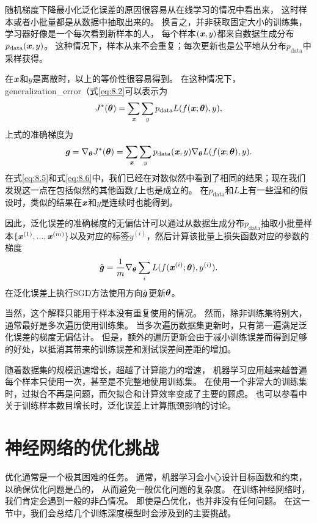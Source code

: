 随机梯度下降最小化泛化误差的原因很容易从在线学习的情况中看出来，
这时样本或者小批量都是从数据中抽取出来的。
换言之，并非获取固定大小的训练集，学习器好像是一个每次看到新样本的人，
每个样本$(\boldsymbol{\mathit{x}},y)$都来自数据生成分布$p_{\text{data}}(\boldsymbol{\mathit{x}},y)$。
这种情况下，样本从来不会重复；每次更新也是公平地从分布$p_\text{data}$中采样获得。

在$\boldsymbol{\mathit{x}}$和$y$是离散时，以上的等价性很容易得到。
在这种情况下，\gls{generalization_error}（式\ref{eq:8.2}可以表示为
\begin{equation}
\label{eq:8.7}
    J^*(\boldsymbol{\theta}) = \sum_{\boldsymbol{\mathit{x}}} \sum_y p_{\text{data}} L(f(\boldsymbol{\mathit{x}}; \boldsymbol{\theta}),y),
\end{equation}
上式的准确梯度为
\begin{equation}
\label{eq:8.8}
    \boldsymbol{\mathit{g}} = \nabla_{\boldsymbol{\theta}} J^*(\boldsymbol{\theta}) = \sum_{\boldsymbol{\mathit{x}}} \sum_y p_{\text{data}}
    (\boldsymbol{\mathit{x}}, y) \nabla_{\boldsymbol{\theta}} L(f(\boldsymbol{\mathit{x}};\boldsymbol{\theta}),y) .
\end{equation}
在式\ref{eq:8.5}和式\ref{eq:8.6}中，我们已经在对数似然中看到了相同的结果；现在我们发现这一点在包括似然的其他函数$f$上也是成立的。
在$p_\text{data}$和$L$上有一些温和的假设时，类似的结果在$\boldsymbol{\mathit{x}}$和$y$是连续时也能得到。

因此，泛化误差的准确梯度的无偏估计可以通过从数据生成分布$p_\text{data}$抽取小批量样本$\{ \boldsymbol{\mathit{x}}^{(1)}, ...,\boldsymbol{\mathit{x}}^{(m)} \}$以及对应的标签$y^{(i)}$，然后计算该批量上损失函数对应的参数的梯度
\begin{equation}
\label{eq:8.9}
    \hat{\boldsymbol{\mathit{g}}} = \frac{1}{m} \nabla_{\boldsymbol{\theta}} \sum_i L(f(\boldsymbol{\mathit{x}}^{(i)};\boldsymbol{\theta}),y^{(i)} ).
\end{equation}
在泛化误差上执行SGD方法使用方向$\hat{\boldsymbol{\mathit{g}}}$更新$\boldsymbol{\theta}$。

当然，这个解释只能用于样本没有重复使用的情况。
然而，除非训练集特别大，通常最好是多次遍历使用训练集。
当多次遍历数据集更新时，只有第一遍满足泛化误差的梯度无偏估计。
但是，额外的遍历更新会由于减小训练误差而得到足够的好处，以抵消其带来的训练误差和测试误差间差距的增加。


随着数据集的规模迅速增长，超越了计算能力的增速，
机器学习应用越来越普遍每个样本只使用一次，甚至是不完整地使用训练集。
在使用一个非常大的训练集时，过拟合不再是问题，而欠拟合和计算效率变成了主要的顾虑。
也可以参看\cite{bottou-bousquet-2008}中关于训练样本数目增长时，泛化误差上计算瓶颈影响的讨论。

\section{神经网络的优化挑战}
\label{sec:challenges_in_neural_network_optimization}
优化通常是一个极其困难的任务。
通常，机器学习会小心设计目标函数和约束，以确保优化问题是凸的，
从而避免一般优化问题的复杂度。
在训练神经网络时，我们肯定会遇到一般的非凸情况。
即使是凸优化，也并非没有任何问题。
在这一节中，我们会总结几个训练深度模型时会涉及到的主要挑战。

